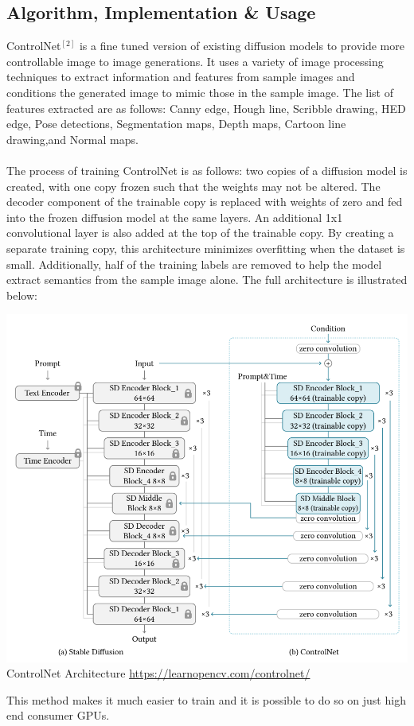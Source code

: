 \documentclass{article}
\begin{document}
\subsection{Algorithm, Implementation \& Usage}
ControlNet$^{[2]}$ is a fine tuned version of existing diffusion models to provide more controllable image to image generations. It uses a variety of image processing techniques to extract information and features from sample images and conditions the generated image to mimic those in the sample image. The list of features extracted are as follows: Canny edge, Hough line, Scribble drawing, HED edge, Pose detections, Segmentation maps, Depth maps, Cartoon line drawing,and Normal maps.  \\ \\
The process of training ControlNet is as follows: two copies of a diffusion model is created, with one copy frozen such that the weights may not be altered. The decoder component of the trainable copy is replaced with weights of zero and fed into the frozen diffusion model at the same layers. An additional 1x1 convolutional layer is also added at the top of the trainable copy. By creating a separate training copy, this architecture minimizes overfitting when the dataset is small. Additionally, half of the training labels are removed to help the model extract semantics from the sample image alone. The full architecture is illustrated below: \\
\begin{center}
    \includegraphics[scale=0.29]{controlnet-with-stable-diffusion.png} \\
    {ControlNet Architecture \href{https://learnopencv.com/controlnet/}{https://learnopencv.com/controlnet/}}
\end{center}
This method makes it much easier to train and it is possible to do so on just high end consumer GPUs.
\end{document}
